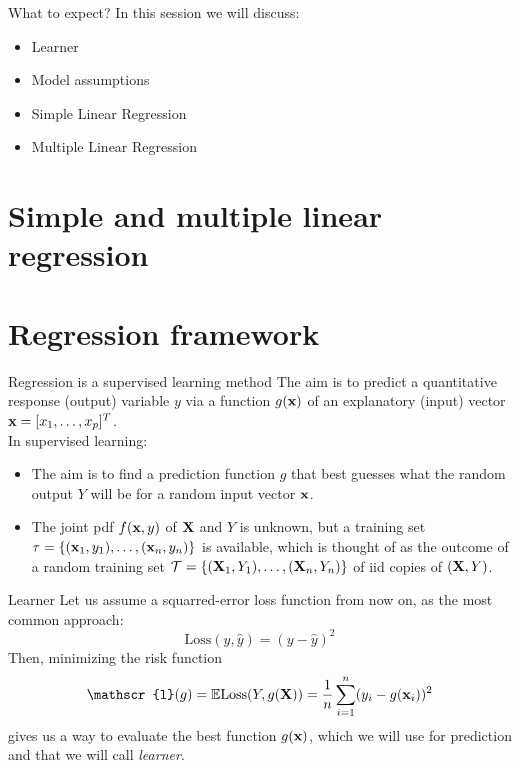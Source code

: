 \documentclass{beamer}
\begin{document}
\begin{frame}{What to expect?}
  In this session we will discuss:
  \begin{itemize}
    \item Learner
    \item Model assumptions
    \item Simple Linear Regression
    \item Multiple Linear Regression
  \end{itemize}
\end{frame}

\section{Simple and multiple linear regression}

\section{Regression framework}

\begin{frame}{Regression is a supervised learning method}
    The aim is to predict a quantitative response (output) variable $y$ via a function $g(\textbf{x})$ of an explanatory (input) vector $\textbf{x}=[x_1,\ldots,x_p]^T$.
    \\[10pt]
    In supervised learning\cite{kroese2020}:
    \begin{itemize}
        \item The aim is to find a prediction function $g$ that best guesses what the random output $Y$ will be for a random input vector $\textbf{x}$.
        \item The joint pdf $f(\textbf{x},y)$ of $\textbf{X}$ and $Y$ is unknown, but a training set $\tau=\{(\textbf{x}_1,y_1),\ldots,(\textbf{x}_n,y_n)\}$ is available, which is thought of as the outcome of a random training set $\mathcal{T}=\{(\textbf{X}_1,Y_1),\ldots,(\textbf{X}_n,Y_n)\}$ of iid copies of $(\textbf{X},Y)$.
    \end{itemize}
\end{frame}

\begin{frame}{Learner}
    Let us assume a squarred-error loss function from now on, as the most common approach:
    \[
        \mathrm{Loss}(y,\hat{y})=(y-\hat{y})^2\]
    Then, minimizing the risk function 
    \[\mathscr{l}(g)=\mathbb{E}\mathrm{Loss}(Y,g(\uvec{X}))=\frac{1}{n}\sum_{i=1}^n(y_i-g(\uvec{x}_i))^2\]
    gives us a way to evaluate the best function $g(\textbf{x})$, which we will use for prediction and that we will call {\em learner}.
\end{frame}
\end{document}
